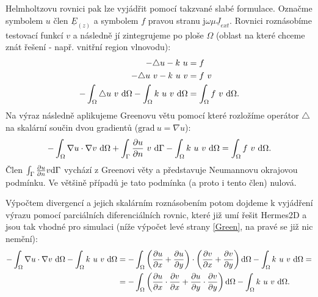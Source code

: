 \documentclass[12pt,a4paper,oneside]{article}
\numberwithin{equation}{section} %
\numberwithin{figure}{section} %
\numberwithin{table}{section} %
\newcommand{\mj}{\mathrm{j}} %
\newcommand{\faz}[1]{{\underline{#1}}} %
\newcommand{\grad}{\mathrm{grad}\ }
\begin{document}
Helmholtzovu rovnici pak lze vyjádřit pomocí takzvané slabé formulace. Označme symbolem $u$ člen $\faz{E} _{(z)}$ a symbolem $f$ pravou stranu $\mj \omega \mu \faz{J} _{ext}$. Rovnici roznásobíme testovací funkcí $v$ a následně jí zintegrujeme po ploše $\Omega$ (oblast na které chceme znát řešení - např. vnitřní region vlnovodu):
\begin{subequations}
\label{Poisson}
\begin{align}
- \triangle u - k ~ u &= f
\\
- \triangle u ~ v - k ~ u ~ v &= f ~ v
\\
- \int _{\Omega} \triangle u ~ v ~ \mathrm{d} \Omega - \int _{\Omega} k ~ u ~ v ~ \mathrm{d} \Omega &= \int _{\Omega} f ~ v ~ \mathrm{d} \Omega .
\end{align}
\end{subequations}
Na výraz následně aplikujeme Greenovu větu pomocí které rozložíme operátor $\triangle$ na skalární součin dvou gradientů ($\grad u = \nabla u$):
\begin{equation}
\label{Green}
- \int _{\Omega} \nabla u \cdot \nabla v ~ \mathrm{d} \Omega + \int _{\Gamma} \frac{\partial u}{\partial n} ~ v ~ \mathrm{d} \Gamma - \int _{\Omega} k ~ u ~ v ~ \mathrm{d} \Omega = \int _{\Omega} f ~ v ~ \mathrm{d} \Omega .
\end{equation}
Člen $\int _{\Gamma} \frac{\partial u}{\partial n} v \mathrm{d} \Gamma$ vychází z Greenovi věty a představuje Neumannovu okrajovou podmínku. Ve většině případů je tato podmínka (a proto i tento člen) nulová.

Výpočtem divergencí a jejich skalárním roznásobením potom dojdeme k vyjádření výrazu pomocí parciálních diferenciálních rovnic, které již umí řešit Hermes2D a jsou tak vhodné pro simulaci (níže výpočet levé strany \ref{Green}, na pravé se již nic nemění):
\begin{equation}
\begin{split}
- \int _{\Omega} \nabla u \cdot \nabla v ~ \mathrm{d} \Omega - \int _{\Omega} k ~ u ~ v ~ \mathrm{d} \Omega &= - \int _{\Omega} \left( \frac{\partial u}{\partial x} + \frac{\partial u}{\partial y} \right) \cdot \left( \frac{\partial v}{\partial x} + \frac{\partial v}{\partial y} \right) \mathrm{d} \Omega - \int _{\Omega} k ~ u ~ v ~ \mathrm{d} \Omega =\\
&= - \int _{\Omega} \left( \frac{\partial u}{\partial x} \cdot \frac{\partial v}{\partial x} + \frac{\partial u}{\partial y} \cdot \frac{\partial v}{\partial y} \right) \mathrm{d} \Omega - \int _{\Omega} k ~ u ~ v ~ \mathrm{d} \Omega .
\end{split}
\end{equation}
\end{document}
